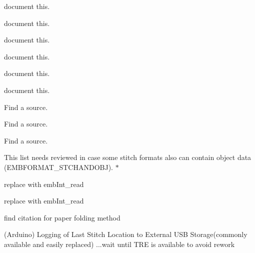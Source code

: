 \begin{DoxyRefList}
%
document this.  
\item[Member \mbox{\hyperlink{imgui__main_8c_a67e0c255f0ba83b53a1b6ac13ae701c7}{enable\+Prompt\+Rapid\+Fire}} (void)]\label{todo__todo000179}%
%
document this.  
\item[Member \mbox{\hyperlink{imgui__main_8c_ae672f52d9b1356d7ed1cae9ffe7abf05}{end\+\_\+command}} (void)]\label{todo__todo000182}%
%
document this.  
\item[Member \mbox{\hyperlink{imgui__main_8c_abc4204026fd25a1d6c397304366d72bf}{enter\+\_\+event}} (int $\ast$event)]\label{todo__todo000037}%
%
document this.  
\item[Member \mbox{\hyperlink{imgui__main_8c_a67e0bec22b963083c5205868262ec0b4}{escape\+\_\+pressed}} (void)]\label{todo__todo000052}%
%
document this. 
\item[Member \mbox{\hyperlink{imgui__main_8c_a1650b0c1f4ac06a65b1778a0e8c118c1}{exit\+\_\+action}} (void)]\label{todo__todo000109}%
%
document this.  
\item[Page \mbox{\hyperlink{md_extern_libembroidery_src_formats_formats}{Formats}} ]\label{todo__todo000262}%
%
Find a source.

\label{todo__todo000261}%
%
Find a source.

\label{todo__todo000263}%
%
Find a source. 
\item[Member \mbox{\hyperlink{formats_8c_a8cb11404ce46501561f956d33f8dcf95}{format\+Table}} \mbox{[}number\+Of\+Formats\mbox{]}]\label{todo__todo000239}%
%
This list needs reviewed in case some stitch formats also can contain object data (EMBFORMAT\+\_\+\+STCHANDOBJ). $\ast$  
\item[Member \mbox{\hyperlink{formats_8c_a05fb50e7292226bc2947dd2b4da7a9bd}{fread\+\_\+int32\+\_\+be}} (FILE $\ast$f)]\label{todo__todo000241}%
%
replace with emb\+Int\+\_\+read  
\item[Member \mbox{\hyperlink{formats_8c_a2bcdb1e6bf6930d5c054ecdca9831eba}{fread\+\_\+uint16}} (FILE $\ast$f)]\label{todo__todo000240}%
%
replace with emb\+Int\+\_\+read  
\item[Member \mbox{\hyperlink{fill_8c_ad02b5d945eacff708d2bf084c40044d8}{generate\+\_\+dragon\+\_\+curve}} (char $\ast$state, int iterations)]\label{todo__todo000234}%
%
find citation for paper folding method  
\item[Page \mbox{\hyperlink{md_extern_libembroidery_src_geometry_geometry}{Geometry and Algorithms}} ]\label{todo__todo000254}%
%
(Arduino) Logging of Last Stitch Location to External USB Storage(commonly available and easily replaced) ...wait until TRE is available to avoid rework


\end{DoxyRefList}
